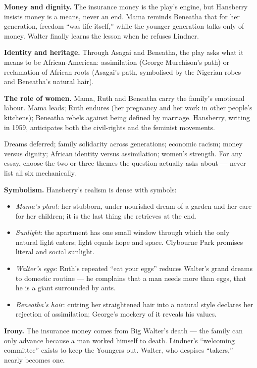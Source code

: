 \documentclass[11pt]{article}
\newcounter{popsec}
\newcounter{popsub}
\newcommand{\courssub}[1]{%
  \stepcounter{popsub}%
  \par\vspace{9pt}\noindent{\popxbold\fontsize{11.5}{13}\selectfont\color{popink}{\color{poporange}\thepopsec.\thepopsub}\hspace{6pt}#1}\par\nopagebreak\vspace{4pt}
}
\begin{document}
\textbf{Money and dignity.} The insurance money is the play's engine, but Hansberry insists money is a means, never an end. Mama reminds Beneatha that for her generation, freedom ``was life itself,'' while the younger generation talks only of money. Walter finally learns the lesson when he refuses Lindner.

\textbf{Identity and heritage.} Through Asagai and Beneatha, the play asks what it means to be African-American: assimilation (George Murchison's path) or reclamation of African roots (Asagai's path, symbolised by the Nigerian robes and Beneatha's natural hair).

\textbf{The role of women.} Mama, Ruth and Beneatha carry the family's emotional labour. Mama leads; Ruth endures (her pregnancy and her work in other people's kitchens); Beneatha rebels against being defined by marriage. Hansberry, writing in 1959, anticipates both the civil-rights and the feminist movements.

\begin{aretenir}
Dreams deferred; family solidarity across generations; economic racism; money versus dignity; African identity versus assimilation; women's strength. For any essay, choose the two or three themes the question actually asks about --- never list all six mechanically.
\end{aretenir}

\courssub{Literary Devices}

\textbf{Symbolism.} Hansberry's realism is dense with symbols:
\begin{itemize}
\item \emph{Mama's plant}: her stubborn, under-nourished dream of a garden and her care for her children; it is the last thing she retrieves at the end.
\item \emph{Sunlight}: the apartment has one small window through which the only natural light enters; light equals hope and space. Clybourne Park promises literal and social sunlight.
\item \emph{Walter's eggs}: Ruth's repeated ``eat your eggs'' reduces Walter's grand dreams to domestic routine --- he complains that a man needs more than eggs, that he is a giant surrounded by ants.
\item \emph{Beneatha's hair}: cutting her straightened hair into a natural style declares her rejection of assimilation; George's mockery of it reveals his values.
\end{itemize}

\textbf{Irony.} The insurance money comes from Big Walter's death --- the family can only advance because a man worked himself to death. Lindner's ``welcoming committee'' exists to keep the Youngers out. Walter, who despises ``takers,'' nearly becomes one.
\end{document}
